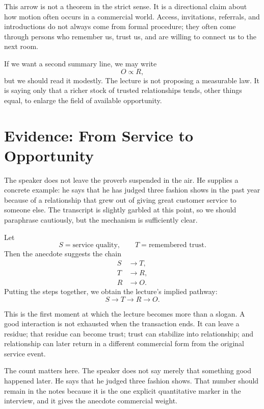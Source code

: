 This arrow is not a theorem in the strict sense. It is a directional claim about how motion often occurs in a commercial world. Access, invitations, referrals, and introductions do not always come from formal procedure; they often come through persons who remember us, trust us, and are willing to connect us to the next room.

If we want a second summary line, we may write
\begin{equation}
O \propto R,
\end{equation}
but we should read it modestly. The lecture is not proposing a measurable law. It is saying only that a richer stock of trusted relationships tends, other things equal, to enlarge the field of available opportunity.

\section{Evidence: From Service to Opportunity}

The speaker does not leave the proverb suspended in the air. He supplies a concrete example: he says that he has judged three fashion shows in the past year because of a relationship that grew out of giving great customer service to someone else. The transcript is slightly garbled at this point, so we should paraphrase cautiously, but the mechanism is sufficiently clear.

Let
\[
S = \text{service quality},
\qquad
T = \text{remembered trust}.
\]
Then the anecdote suggests the chain
\begin{align}
S &\to T,\\
T &\to R,\\
R &\to O.
\end{align}
Putting the steps together, we obtain the lecture's implied pathway:
\begin{equation}
S \to T \to R \to O.
\end{equation}

This is the first moment at which the lecture becomes more than a slogan. A good interaction is not exhausted when the transaction ends. It can leave a residue; that residue can become trust; trust can stabilize into relationship; and relationship can later return in a different commercial form from the original service event.

The count matters here. The speaker does not say merely that something good happened later. He says that he judged three fashion shows. That number should remain in the notes because it is the one explicit quantitative marker in the interview, and it gives the anecdote commercial weight.

